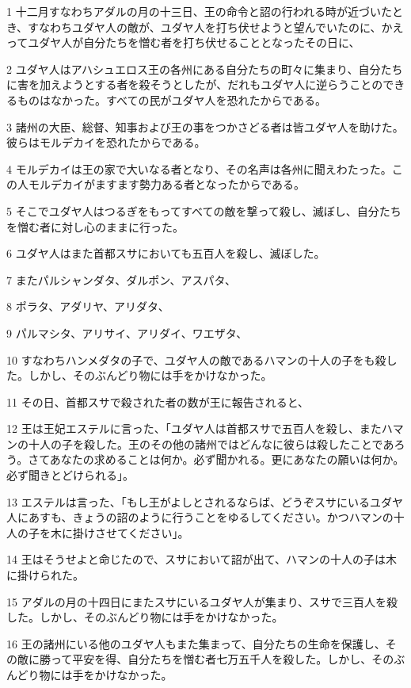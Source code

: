 \par 1 十二月すなわちアダルの月の十三日、王の命令と詔の行われる時が近づいたとき、すなわちユダヤ人の敵が、ユダヤ人を打ち伏せようと望んでいたのに、かえってユダヤ人が自分たちを憎む者を打ち伏せることとなったその日に、
\par 2 ユダヤ人はアハシュエロス王の各州にある自分たちの町々に集まり、自分たちに害を加えようとする者を殺そうとしたが、だれもユダヤ人に逆らうことのできるものはなかった。すべての民がユダヤ人を恐れたからである。
\par 3 諸州の大臣、総督、知事および王の事をつかさどる者は皆ユダヤ人を助けた。彼らはモルデカイを恐れたからである。
\par 4 モルデカイは王の家で大いなる者となり、その名声は各州に聞えわたった。この人モルデカイがますます勢力ある者となったからである。
\par 5 そこでユダヤ人はつるぎをもってすべての敵を撃って殺し、滅ぼし、自分たちを憎む者に対し心のままに行った。
\par 6 ユダヤ人はまた首都スサにおいても五百人を殺し、滅ぼした。
\par 7 またパルシャンダタ、ダルポン、アスパタ、
\par 8 ポラタ、アダリヤ、アリダタ、
\par 9 パルマシタ、アリサイ、アリダイ、ワエザタ、
\par 10 すなわちハンメダタの子で、ユダヤ人の敵であるハマンの十人の子をも殺した。しかし、そのぶんどり物には手をかけなかった。
\par 11 その日、首都スサで殺された者の数が王に報告されると、
\par 12 王は王妃エステルに言った、「ユダヤ人は首都スサで五百人を殺し、またハマンの十人の子を殺した。王のその他の諸州ではどんなに彼らは殺したことであろう。さてあなたの求めることは何か。必ず聞かれる。更にあなたの願いは何か。必ず聞きとどけられる」。
\par 13 エステルは言った、「もし王がよしとされるならば、どうぞスサにいるユダヤ人にあすも、きょうの詔のように行うことをゆるしてください。かつハマンの十人の子を木に掛けさせてください」。
\par 14 王はそうせよと命じたので、スサにおいて詔が出て、ハマンの十人の子は木に掛けられた。
\par 15 アダルの月の十四日にまたスサにいるユダヤ人が集まり、スサで三百人を殺した。しかし、そのぶんどり物には手をかけなかった。
\par 16 王の諸州にいる他のユダヤ人もまた集まって、自分たちの生命を保護し、その敵に勝って平安を得、自分たちを憎む者七万五千人を殺した。しかし、そのぶんどり物には手をかけなかった。
